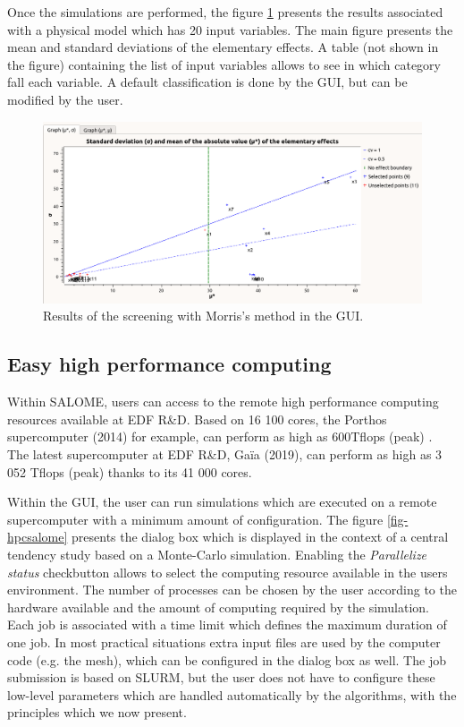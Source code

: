 \documentclass{article}
\begin{document}
Once the simulations are performed, the figure \ref{fig-morrisresultats} presents the results 
associated with a physical model which has 20 input variables. 
The main figure presents the mean and standard deviations of the elementary effects. 
A table (not shown in the figure) containing the list of input variables allows 
to see in which category fall each variable. 
A default classification is done by the GUI, but can be modified by the user. 

\begin{figure}
\centering
\includegraphics[width=\textwidth]{figures/morrisResultWindow-up.png}
\caption{Results of the screening with Morris's method in the GUI.}
\label{fig-morrisresultats}
\end{figure}


\subsection{Easy high performance computing}
\label{sec-hpceasy}

Within SALOME, users can access to the remote high performance computing 
resources available at EDF R\&D. 
Based on 16 100 cores, the Porthos supercomputer (2014) for example, can perform as high as 600Tflops (peak) \cite{Top500Porthos}. 
The latest supercomputer at EDF R\&D, Gaïa (2019), can perform as high as 3 052 Tflops (peak) \cite{Top500Gaia} 
thanks to its 41 000 cores. 

Within the GUI, the user can run simulations which are executed on a remote supercomputer with 
a minimum amount of configuration. 
The figure \ref{fig-hpcsalome} presents the dialog box which is displayed in the 
context of a central tendency study based on a Monte-Carlo simulation. 
Enabling the \emph{Parallelize status} checkbutton allows to select the 
computing resource available in the users environment. 
The number of processes can be chosen by the user according to the hardware available 
and the amount of computing required by the simulation. 
Each job is associated with a time limit which defines the maximum 
duration of one job. 
In most practical situations extra input files are used by the computer code (e.g. the mesh), 
which can be configured in the dialog box as well. 
The job submission is based on SLURM, but the user does not have to configure these 
low-level parameters which are handled automatically by the algorithms, with the principles 
which we now present. 
\end{document}
